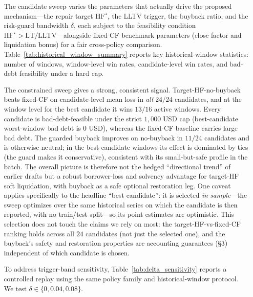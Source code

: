 \documentclass[12pt]{article}
\begin{document}
The candidate sweep varies the parameters that actually drive the proposed mechanism---the repair target $\mathrm{HF}^{\star}$, the LLTV trigger, the buyback ratio, and the risk-guard bandwidth $\delta$, each subject to the feasibility condition $\mathrm{HF}^{\star}>\mathrm{LT}/\mathrm{LLTV}$---alongside fixed-CF benchmark parameters (close factor and liquidation bonus) for a fair cross-policy comparison. Table~\ref{tab:historical_window_summary} reports key historical-window statistics: number of windows, window-level win rates, candidate-level win rates, and bad-debt feasibility under a hard cap.


The constrained sweep gives a strong, consistent signal. Target-HF-no-buyback beats fixed-CF on candidate-level mean loss in \emph{all} $24/24$ candidates, and at the window level for the best candidate it wins $13/16$ active windows. Every candidate is bad-debt-feasible under the strict $1{,}000$ USD cap (best-candidate worst-window bad debt is $0$ USD), whereas the fixed-CF baseline carries large bad debt. The guarded buyback improves on no-buyback in $11/24$ candidates and is otherwise neutral; in the best-candidate windows its effect is dominated by ties (the guard makes it conservative), consistent with its small-but-safe profile in the batch. The overall picture is therefore not the hedged ``directional trend'' of earlier drafts but a robust borrower-loss and solvency advantage for target-HF soft liquidation, with buyback as a safe optional restoration leg. One caveat applies specifically to the headline ``best candidate'': it is selected \emph{in-sample}---the sweep optimizes over the same historical series on which the candidate is then reported, with no train/test split---so its point estimates are optimistic. This selection does not touch the claims we rely on most: the target-HF-vs-fixed-CF ranking holds across all $24$ candidates (not just the selected one), and the buyback's safety and restoration properties are accounting guarantees (\S3) independent of which candidate is chosen.

To address trigger-band sensitivity, Table~\ref{tab:delta_sensitivity} reports a controlled replay using the same policy family and historical-window protocol. We test $\delta\in\{0, 0.04, 0.08\}$.

\end{document}
